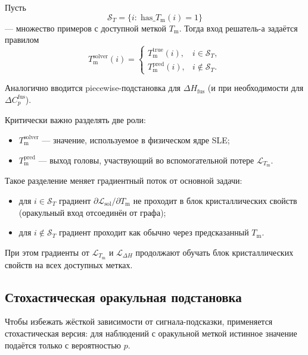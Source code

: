 \documentclass[11pt]{article}
\begin{document}
Пусть
\begin{equation*}
\mathcal{S}_T = \{i:\;\mathrm{has\_}T_{\mathrm{m}}(i)=1\}
\end{equation*}
--- множество примеров с доступной меткой $T_{\mathrm{m}}$. Тогда вход решатель-а задаётся правилом
\begin{equation*}
T_{\mathrm{m}}^{\mathrm{solver}}(i)=
\begin{cases}
T_{\mathrm{m}}^{\mathrm{true}}(i), & i\in\mathcal{S}_T,\\
T_{\mathrm{m}}^{\mathrm{pred}}(i), & i\notin\mathcal{S}_T.
\end{cases}
\end{equation*}

Аналогично вводится piecewise-подстановка для $\Delta H_{\mathrm{fus}}$ (и при необходимости для $\Delta C_p^{\mathrm{fus}}$).

Критически важно разделять две роли:
\begin{itemize}
  \item $T_{\mathrm{m}}^{\mathrm{solver}}$ --- значение, используемое в физическом ядре SLE;
  \item $T_{\mathrm{m}}^{\mathrm{pred}}$ --- выход головы, участвующий во вспомогательной потере $\mathcal{L}_{T_{\mathrm{m}}}$.
\end{itemize}

Такое разделение меняет градиентный поток от основной задачи:
\begin{itemize}
  \item для $i\in\mathcal{S}_T$ градиент $\partial\mathcal{L}_{\mathrm{sol}}/\partial T_{\mathrm{m}}$ не проходит в блок кристаллических свойств (оракульный вход отсоединён от графа);
  \item для $i\notin\mathcal{S}_T$ градиент проходит как обычно через предсказанный $T_{\mathrm{m}}$.
\end{itemize}

При этом градиенты от $\mathcal{L}_{T_{\mathrm{m}}}$ и $\mathcal{L}_{\Delta H}$ продолжают обучать блок кристаллических свойств на всех доступных метках.

\subsection{Стохастическая оракульная подстановка}

Чтобы избежать жёсткой зависимости от сигнала-подсказки, применяется стохастическая версия: для наблюдений с оракульной меткой истинное значение подаётся только с вероятностью $p$.
\end{document}

